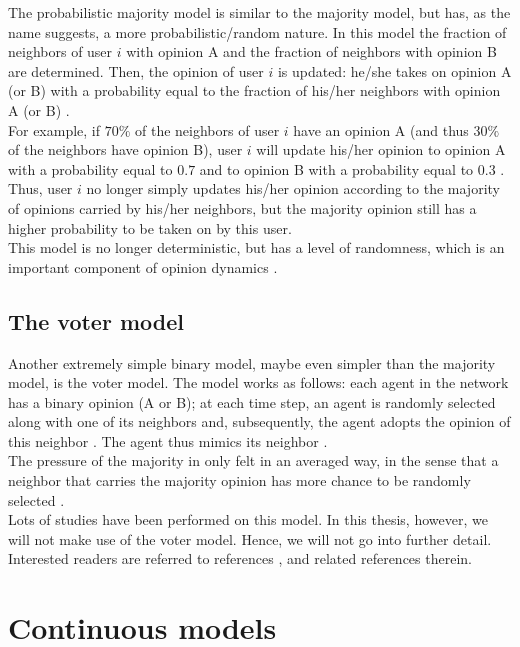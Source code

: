 \documentclass[11 pt , letterpaper , twoside , openright]{book}
\begin{document}
The probabilistic majority model is similar to the majority model, but has, as the name suggests, a more probabilistic/random nature. In this model the fraction of neighbors of user $i$ with opinion A and the fraction of neighbors with opinion B are determined. Then, the opinion of user $i$ is updated: he/she takes on opinion A (or B) with a probability equal to the fraction of his/her neighbors with opinion A (or B) \cite{Perra2019}.\\
\newpage
\noindent
For example, if $70\%$ of the neighbors of user $i$ have an opinion A (and thus $30 \%$ of the neighbors have opinion B), user $i$ will update his/her opinion to opinion A with a probability equal to $0.7$ and to opinion B with a probability equal to $0.3$ \cite{Perra2019}. Thus, user $i$ no longer simply updates his/her opinion according to the majority of opinions carried by his/her neighbors, but the majority opinion still has a higher probability to be taken on by this user.\\
This model is no longer deterministic, but has a level of randomness, which is an important component of opinion dynamics \cite{Perra2019}. 

\subsection{The voter model}

Another extremely simple binary model, maybe even simpler than the majority model, is the voter model. The model works as follows: each agent in the network has a binary opinion (A or B); at each time step, an agent is randomly selected along with one of its neighbors and, subsequently, the agent adopts the opinion of this neighbor \cite{Castellano2009}. The agent thus mimics its neighbor \cite{Castellano2009}. \\
The pressure of the majority in only felt in an averaged way, in the sense that a neighbor that carries the majority opinion has more chance to be randomly selected \cite{Castellano2009}.\\
Lots of studies have been performed on this model. In this thesis, however, we will not make use of the voter model. Hence, we will not go into further detail. Interested readers are referred to references \cite{Castellano2009}, \cite{Fernandez2014} and related references therein.

\section{Continuous models}\label{Con}
\end{document}
